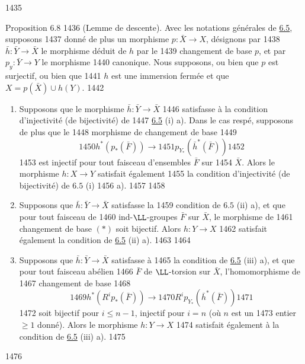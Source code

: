   1435	\begin{enonce*}{Proposition 6.8}
  1436	(Lemme de descente). Avec les notations générales de \hyperref[XII.prop6.5]{6.5}, supposons
  1437	donné de plus un morphisme $p:\bar{X}\rightarrow X$, désignons par
  1438	$\bar{h}:\bar{Y}\rightarrow \bar{X}$ le morphisme déduit de $h$ par le
  1439	changement de base $p$, et par $p_y:\bar{Y}\rightarrow Y$ le morphisme
  1440	canonique. Nous supposons, ou bien que $p$ est surjectif, ou bien que
  1441	$h$ est une immersion fermée et que $X=p(\bar{X})\cup h(Y)$.
  1442	\begin{enumerate}
  1443	\renewcommand{\theenumi}{\roman{enumi}}
  1444	\renewcommand{\labelenumi}{(\theenumi)}
  1445	\item Supposons que le morphisme $\bar{h}:\bar{Y}\rightarrow \bar{X}$
  1446	satisfasse à la condition d'injectivité (\resp de bijectivité) de
  1447	\hyperref[XII.prop6.5]{6.5} {\rm(i) a)}. Dans le cas respé, supposons de plus que le
  1448	morphisme de changement de base
  1449	\begin{equation*}
  1450	h^{\ast}(p_{\ast}(\bar{F}))\longrightarrow
  1451	p_{Y_{\ast}}(\bar{h}^{\ast}(\bar{F}))\tag{$\ast$} 
  1452	\end{equation*}
  1453	est injectif pour tout faisceau d'ensembles $\bar{F}$ sur
  1454	$\bar{X}$. Alors le morphisme $h:X\rightarrow Y$ satisfait également
  1455	la condition d'injectivité (\resp de bijectivité) de $6.5$ {\rm(i)
  1456	a).}
  1457	
  1458	\item Supposons que $\bar{h}:\bar{Y}\rightarrow \bar{X}$ satisfasse la
  1459	condition de $6.5$ {\rm(ii) a)}, et que pour tout faisceau de
  1460	{\rm ind}-$\LL$-groupes $\bar{F}$ sur $\bar{X}$, le morphisme de
  1461	changement de base $(\ast)$ soit bijectif. Alors $h:Y\rightarrow X$
  1462	satisfait également la condition de {\rm \hyperref[XII.prop6.5]{6.5} (ii) a).}
  1463	
  1464	\item Supposons que $\bar{h}:\bar{Y}\rightarrow \bar{X}$ satisfasse à
  1465	la condition de {\rm \hyperref[XII.prop6.5]{6.5} (iii) a),} et que pour tout faisceau abélien
  1466	$\bar{F}$ de $\LL$-torsion sur $\bar{X}$, l'homomorphisme de
  1467	changement de base
  1468	$$
  1469	h^{\ast}(R^{i}p_{\ast}(\bar{F}))\longrightarrow
  1470	R^{i}p_{Y_{\ast}}(\bar{h}^{\ast}(\bar{F}))
  1471	$$
  1472	soit bijectif pour $i\leq n-1$, injectif pour $i=n$ (où $n$ est un
  1473	entier $\geq 1$ donné). Alors le morphisme $h:Y\rightarrow X$
  1474	satisfait également à la condition de {\rm \hyperref[XII.prop6.5]{6.5} (iii) a).}
  1475	\end{enumerate}
  1476	\end{enonce*}
